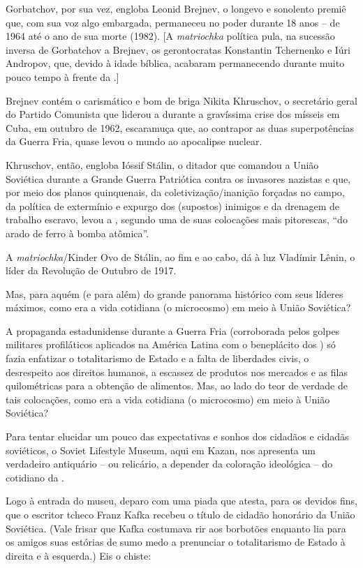 Gorbatchov, por sua vez, engloba Leonid Brejnev, o longevo e sonolento
premiê que, com sua voz algo embargada, permaneceu no poder durante 18
anos -- de 1964 até o ano de sua morte (1982). {[}A \emph{matriochka}
política pula, na sucessão inversa de Gorbatchov a Brejnev, os
gerontocratas Konstantin Tchernenko e Iúri Andropov, que, devido à idade
bíblica, acabaram permanecendo durante muito pouco tempo à frente da
.{]}

Brejnev contém o carismático e bom de briga Nikita Khruschov, o
secretário geral do Partido Comunista que liderou a  durante a
gravíssima crise dos mísseis em Cuba, em outubro de 1962, escaramuça
que, ao contrapor as duas superpotências da Guerra Fria, quase levou o
mundo ao apocalipse nuclear.

Khruschov, então, engloba Ióssif Stálin, o ditador que comandou a União
Soviética durante a Grande Guerra Patriótica contra os invasores
nazistas e que, por meio dos planos quinquenais, da
coletivização/inanição forçadas no campo, da política de extermínio e
expurgo dos (supostos) inimigos e da drenagem de trabalho escravo, levou
a , segundo uma de suas colocações mais pitorescas, ``do arado de
ferro à bomba atômica''.

A \emph{matriochka}/Kinder Ovo de Stálin, ao fim e ao cabo, dá à luz
Vladímir Lênin, o líder da Revolução de Outubro de 1917.

Mas, para aquém (e para além) do grande panorama histórico com seus
líderes máximos, como era a vida cotidiana (o microcosmo) em meio à
União Soviética?

A propaganda estadunidense durante a Guerra Fria (corroborada pelos
golpes militares profiláticos aplicados na América Latina com o
beneplácito dos ) só fazia enfatizar o totalitarismo de Estado e a
falta de liberdades civis, o desrespeito aos direitos humanos, a
escassez de produtos nos mercados e as filas quilométricas para a
obtenção de alimentos. Mas, ao lado do teor de verdade de tais
colocações, como era a vida cotidiana (o microcosmo) em meio à União
Soviética?

Para tentar elucidar um pouco das expectativas e sonhos dos cidadãos e
cidadãs soviéticos, o Soviet Lifestyle Museum, aqui em Kazan, nos
apresenta um verdadeiro antiquário -- ou relicário, a depender da
coloração ideológica -- do cotidiano da .

Logo à entrada do museu, deparo com uma piada que atesta, para os
devidos fins, que o escritor tcheco Franz Kafka recebeu o título de
cidadão honorário da União Soviética. (Vale frisar que Kafka costumava
rir aos borbotões enquanto lia para os amigos suas estórias de sumo medo
a prenunciar o totalitarismo de Estado à direita e à esquerda.) Eis o
chiste:

